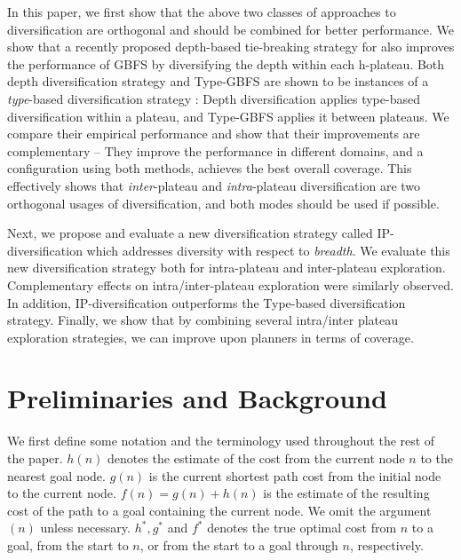 In this paper, we first show that  the above two classes of approaches to diversification are orthogonal and should be combined for better performance.
We show that a recently proposed depth-based tie-breaking strategy for \astar \cite{Asai2016} also improves the performance of GBFS by diversifying the depth within each h-plateau.
Both depth diversification strategy and Type-GBFS are shown to be instances of a \emph{type}-based diversification strategy \cite{xie14type}: Depth diversification applies type-based diversification within a plateau, and Type-GBFS applies it between plateaus.
We compare their empirical performance and show that their improvements are complementary -- 
They improve the performance in different domains, and a configuration using both methods, achieves the best overall coverage.
This effectively shows that \emph{inter}-plateau and \emph{intra}-plateau diversification are two orthogonal usages of diversification, and both modes should be used if possible.
 
Next, we propose and evaluate a new diversification strategy called IP-diversification which addresses diversity with respect to \emph{breadth}.
We evaluate this new diversification strategy both for intra-plateau and inter-plateau exploration.
Complementary effects on intra/inter-plateau exploration were similarly observed. In addition, IP-diversification outperforms the Type-based diversification strategy.
Finally, we show that by combining several intra/inter plateau exploration strategies, we can improve upon \lsota planners in terms of coverage.

\section{Preliminaries and Background}

We first define some notation and the terminology used throughout the
rest of the paper.
$h(n)$ denotes the estimate of the cost from the current node $n$ to the nearest goal node.
$g(n)$ is the current shortest path cost from the initial node to the current node.
$f(n)=g(n)+h(n)$ is the estimate of the resulting cost of the path to a goal
containing the current node.
We omit the argument $(n)$ unless necessary.
$h^*,g^*$ and $f^*$ denotes the true optimal cost from $n$ to
a goal, from the start to $n$, or from the start to a goal through $n$, respectively.

